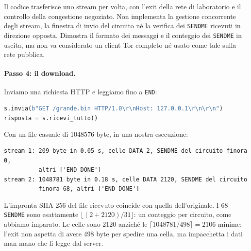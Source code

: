 \begin{attenzione}
Il codice  trasferisce uno stream per volta,
con l'exit della rete di laboratorio e il controllo della congestione negoziato.
Non implementa la gestione concorrente degli stream, la finestra di invio
del circuito né la verifica dei \texttt{SENDME} ricevuti in direzione opposta.
Dimostra il formato dei messaggi e il conteggio dei \texttt{SENDME} in uscita,
ma non va considerato un client Tor completo né usato come tale sulla rete pubblica.
\end{attenzione}

\paragraph{Passo 4: il download.} Inviamo una richiesta HTTP e leggiamo fino a \texttt{END}:
\begin{lstlisting}[language=Python]
s.invia(b"GET /grande.bin HTTP/1.0\r\nHost: 127.0.0.1\r\n\r\n")
risposta = s.ricevi_tutto()
\end{lstlisting}
Con un file casuale di \num{1048576} byte, in una nostra esecuzione:
\begin{lstlisting}[numbers=none]
stream 1: 209 byte in 0.05 s, celle DATA 2, SENDME del circuito finora 0,
          altri ['END DONE']
stream 2: 1048781 byte in 0.18 s, celle DATA 2120, SENDME del circuito
          finora 68, altri ['END DONE']
\end{lstlisting}
L'impronta SHA-256 del file ricevuto coincide con quella dell'originale. I 68 \texttt{SENDME} sono esattamente $\lfloor (2 + 2120) / 31 \rfloor$: un conteggio per circuito, come abbiamo imparato. Le celle sono 2120 anziché le $\lceil 1048781 / 498 \rceil = 2106$ minime: l'exit non aspetta di avere 498 byte per spedire una cella, ma impacchetta i dati man mano che li legge dal server.

